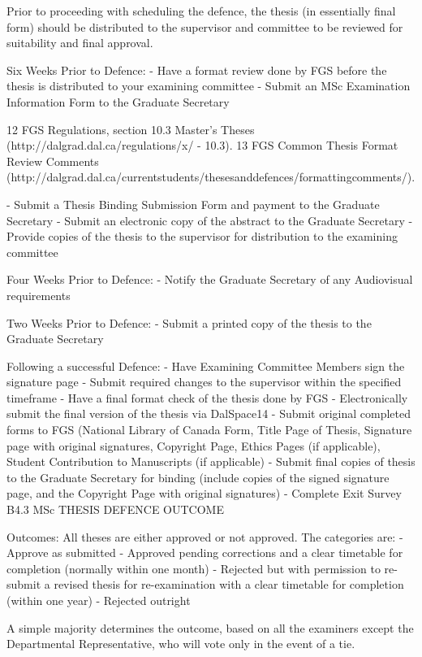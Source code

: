 Prior to proceeding with scheduling the defence, the thesis (in essentially final form) should be distributed to the supervisor and committee to be reviewed for suitability and final approval.

Six Weeks Prior to Defence:
-	Have a format review done by FGS before the thesis is distributed to your examining committee
-	Submit an MSc Examination Information Form to the Graduate Secretary

12 FGS Regulations, section 10.3 Master’s Theses (http://dalgrad.dal.ca/regulations/x/ - 10.3). 13 FGS Common Thesis Format Review Comments (http://dalgrad.dal.ca/currentstudents/thesesanddefences/formattingcomments/).
 

-	Submit a Thesis Binding Submission Form and payment to the Graduate Secretary
-	Submit an electronic copy of the abstract to the Graduate Secretary
-	Provide copies of the thesis to the supervisor for distribution to the examining committee

Four Weeks Prior to Defence:
-	Notify the Graduate Secretary of any Audiovisual requirements

Two Weeks Prior to Defence:
-	Submit a printed copy of the thesis to the Graduate Secretary

Following a successful Defence:
-	Have Examining Committee Members sign the signature page
-	Submit required changes to the supervisor within the specified timeframe
-	Have a final format check of the thesis done by FGS
-	Electronically submit the final version of the thesis via DalSpace14
-	Submit original completed forms to FGS (National Library of Canada Form, Title Page of Thesis, Signature page with original signatures, Copyright Page, Ethics Pages (if applicable), Student Contribution to Manuscripts (if applicable)
-	Submit final copies of thesis to the Graduate Secretary for binding (include copies of the signed signature page, and the Copyright Page with original signatures)
-	Complete Exit Survey
B4.3	MSc THESIS DEFENCE OUTCOME

Outcomes: All theses are either approved or not approved. The categories are:
-	Approve as submitted
-	Approved pending corrections and a clear timetable for completion (normally within one month)
-	Rejected but with permission to re-submit a revised thesis for re-examination with a clear timetable for completion (within one year)
-	Rejected outright

A simple majority determines the outcome, based on all the examiners except the Departmental Representative, who will vote only in the event of a tie.

